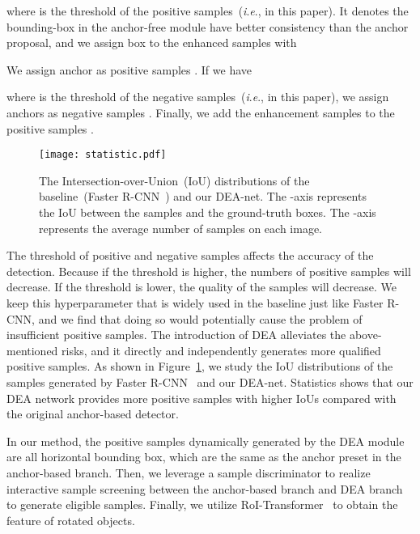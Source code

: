 \documentclass[journal]{IEEEtran}
\newcommand{\ie}{\textit{i}.\textit{e}.}
\begin{document}
where  is the threshold of the positive samples~(\ie,  in this paper). It denotes the bounding-box in the anchor-free module have better consistency than the anchor proposal, and we assign box  to the enhanced samples  with

We assign anchor  as positive samples . If we have

where  is the threshold of the negative samples~(\ie,  in this paper), we assign anchors  as negative samples . Finally, we add the enhancement samples  to the positive samples . 


\begin{figure}[t]
	\centering
	\texttt{[image: statistic.pdf]}
	\caption{The Intersection-over-Union~(IoU) distributions of the baseline~(Faster R-CNN~\cite{ren2016faster}) and our DEA-net. The -axis represents the IoU between the samples and the ground-truth boxes. The -axis represents the average number of samples on each image.}
	\label{statistic}
\end{figure}
The threshold of positive and negative samples affects the accuracy of the detection. Because if the threshold is higher, the numbers of positive samples will decrease. If the threshold is lower, the quality of the samples will decrease. We keep this hyperparameter that is widely used in the baseline just like Faster R-CNN, and we find that doing so would potentially cause the problem of insufficient positive samples. The introduction of DEA alleviates the above-mentioned risks, and it directly and independently generates more qualified positive samples.  As shown in Figure~\ref{statistic}, we study the IoU distributions of the samples generated by Faster R-CNN~\cite{ren2016faster} and our DEA-net. Statistics shows that our DEA network provides more positive samples with higher IoUs compared with the original anchor-based detector. 

In our method, the positive samples dynamically generated by the DEA module are all horizontal bounding box, which are the same as the anchor preset in the anchor-based branch. Then, we leverage a sample discriminator to realize interactive sample screening between the anchor-based branch and DEA branch to generate eligible samples. Finally, we utilize RoI-Transformer~\cite{ding2019learning} to obtain the feature of rotated objects.
\end{document}
